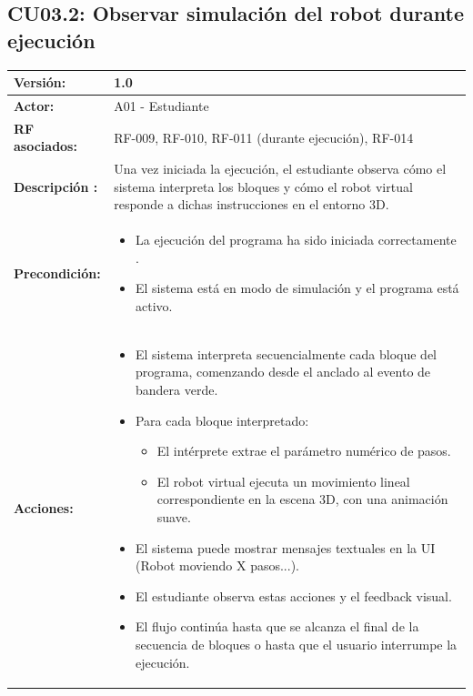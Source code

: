 \subsection{CU03.2: Observar simulación del robot durante ejecución} \label{sec:CU03_2_ObservarSimulacion}
\begin{table}[H]
	\centering
	\begin{tabularx}{\linewidth}{|p{3cm}|X|}
	
		\hline
		\textbf{Versión:} & 1.0 \\
		\hline
		\textbf{Actor:} & A01 - Estudiante \\
		\hline
		\textbf{RF asociados:} & RF-009, RF-010, RF-011 (durante ejecución), RF-014 \\
		\hline
		\textbf{Descripción :} & Una vez iniciada la ejecución, el estudiante observa cómo el sistema interpreta los bloques y cómo el robot virtual responde a dichas instrucciones en el entorno 3D. \\
		\hline
		\textbf{Precondición:} & 
		\begin{itemize}
			\item La ejecución del programa ha sido iniciada correctamente .
			\item El sistema está en modo de simulación y el programa está activo.
		\end{itemize} \\
		\hline
		\textbf{Acciones:} & 
		\begin{itemize}
			\item El sistema  interpreta secuencialmente cada bloque del programa, comenzando desde el anclado al evento de bandera verde.
			\item Para cada bloque  interpretado:
			\begin{itemize}
				\item El intérprete extrae el parámetro numérico de pasos.
				\item El robot virtual ejecuta un movimiento lineal correspondiente en la escena 3D, con una animación suave.
			\end{itemize}
			\item El sistema puede mostrar mensajes textuales en la UI (Robot moviendo X pasos...).
			\item El estudiante observa estas acciones y el feedback visual.
			\item El flujo continúa hasta que se alcanza el final de la secuencia de bloques o hasta que el usuario interrumpe la ejecución.
		\end{itemize} \\

\end{tabularx}
\end{table}
